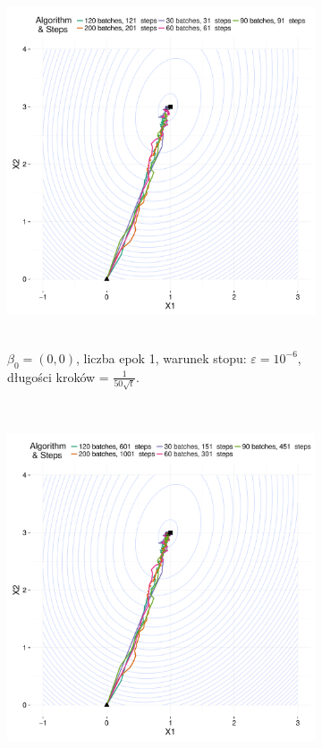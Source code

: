 \newpage

\begin{figure}[hbt!]
  \begin{center}
   \begin{subfigure}[h!]{0.9\textwidth}
      \includegraphics[width=\textwidth, height=310pt]{Obrazki/b_0_0_iter_1_e-6_50sqrt.pdf}
      \caption{$\beta_0=(0,0)$, liczba epok 1, warunek stopu: $\varepsilon=10^{-6}$, długości kroków = $\frac{1}{50\sqrt{t}}$.}
   \end{subfigure}     
   \begin{subfigure}[h!]{0.9\textwidth}
      \includegraphics[width=\textwidth, height=310pt]{Obrazki/b_0_0_iter_5_e-6_50sqrt.pdf}

\end{subfigure}
\end{center}
\end{figure}
